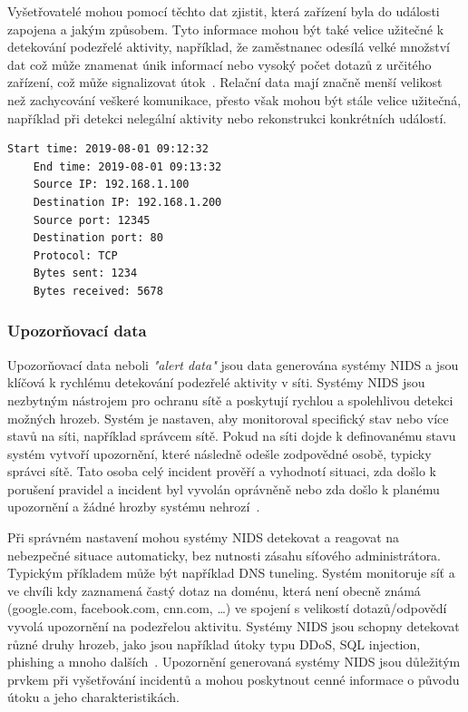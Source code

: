     Vyšetřovatelé mohou pomocí těchto dat zjistit, která zařízení byla do události zapojena \newline a jakým způsobem. Tyto informace mohou být také velice užitečné k detekování podezřelé aktivity, například, že zaměstnanec odesílá velké množství dat což může znamenat únik informací nebo vysoký počet dotazů z určitého zařízení, což může signalizovat útok~\cite{EnisaReference}. Relační data mají značně menší velikost než zachycování veškeré komunikace, přesto však mohou být stále velice užitečná, například při detekci nelegální aktivity nebo rekonstrukci konkrétních událostí.
    
        \begin{lstlisting}[caption={Příklad relačních dat}, label={lst:SessionData}, breaklines]
    Start time: 2019-08-01 09:12:32
    End time: 2019-08-01 09:13:32
    Source IP: 192.168.1.100
    Destination IP: 192.168.1.200
    Source port: 12345
    Destination port: 80
    Protocol: TCP
    Bytes sent: 1234
    Bytes received: 5678
    \end{lstlisting}
    
    \subsubsection*{Upozorňovací data}
    Upozorňovací data neboli \textit{"alert data"} jsou data generována systémy \gls{NIDS} a jsou klíčová \newline k rychlému detekování podezřelé aktivity v síti. Systémy NIDS jsou nezbytným nástrojem pro ochranu sítě a poskytují rychlou a spolehlivou detekci možných hrozeb. Systém je nastaven, aby monitoroval specifický stav nebo více stavů na síti, například správcem sítě. Pokud na síti dojde k definovanému stavu systém vytvoří upozornění, které následně odešle zodpovědné osobě, typicky správci sítě. Tato osoba celý incident prověří a vyhodnotí situaci, zda došlo k porušení pravidel a incident byl vyvolán oprávněně nebo zda došlo k planému upozornění a žádné hrozby systému nehrozí~\cite{EnisaReference}.

    Při správném nastavení mohou systémy NIDS detekovat a reagovat na nebezpečné situace automaticky, bez nutnosti zásahu síťového administrátora. Typickým příkladem může být například \gls{DNS} tuneling. Systém monitoruje síť a ve chvíli kdy zaznamená častý dotaz na doménu, která není obecně známá (google.com, facebook.com, cnn.com, …) ve spojení s velikostí dotazů/odpovědí vyvolá upozornění na podezřelou aktivitu. Systémy NIDS jsou schopny detekovat různé druhy hrozeb, jako jsou například útoky typu \gls{DDoS}, \gls{SQL} injection, phishing a mnoho dalších~\cite{FundamentalsOfNetworkForensicsReference}. Upozornění generovaná systémy NIDS jsou důležitým prvkem při vyšetřování incidentů a mohou poskytnout cenné informace o původu útoku a jeho charakteristikách.
    
